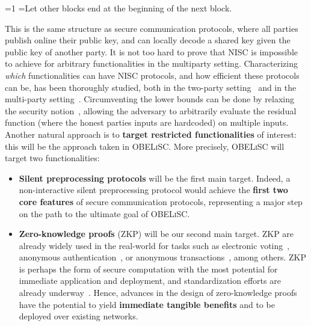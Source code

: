 \documentclass[oneside, a4paper, onecolumn, 11pt]{article}
\newcommand{\OBELiSC}{\textsc{OBELiSC}\xspace}
\newcounter{alphasect}
\def\alphainsection{0}
\newenvironment{alphasection}{%
  \ifnum\alphainsection=1%
    \errhelp={Let other blocks end at the beginning of the next block.}
    \errmessage{Nested Alpha section not allowed}
  \fi%
  \setcounter{alphasect}{0}
  \def\alphainsection{1}
}{%
  \setcounter{alphasect}{0}
  \def\alphainsection{0}
}%
\begin{document}
\begin{alphasection}
This is the same structure as secure communication protocols, where all parties publish online their public key, and can locally decode a shared key given the public key of another party. It is not too hard to prove that NISC is impossible to achieve for arbitrary functionalities in the multiparty setting. Characterizing \emph{which} functionalities can have NISC protocols, and how efficient these protocols can be, has been thoroughly studied, both in the two-party setting~\cite{EC:IKOPS11,EC:AMPR14,EC:MohRos17,AC:BJOV18,C:CDIKLOV19,CCS:BCGIKRS19} and in the multi-party setting~\cite{C:BGIKMP14,AC:HIJKSY17,C:BenKraRab17,EC:MorPasPol20,TCC:BenLin20,C:EOYN21,EC:BJKL21}. Circumventing the lower bounds can be done by relaxing the security notion~\cite{C:BGIKMP14,C:EOYN21}, allowing the adversary to arbitrarily evaluate the residual function (where the honest parties inputs are hardcoded) on multiple inputs. Another natural approach is to \textbf{target restricted functionalities} of interest: this will be the approach taken in \OBELiSC. More precisely, \OBELiSC will target two functionalities:
\begin{itemize}
    \item \textbf{Silent preprocessing protocols} will be the first main target. Indeed, a non-interactive silent preprocessing protocol would achieve the \textbf{first two core features} of secure communication protocols, representing a major step on the path to the ultimate goal of \OBELiSC.
    \item \textbf{Zero-knowledge proofs} (ZKP) will be our second main target. ZKP are already widely used in the real-world for tasks such as electronic voting~\cite{helios,belenios}, anonymous authentication~\cite{AC:Chaum90}, or anonymous transactions~\cite{FC:BAZB20,monero}, among others. ZKP is perhaps the form of secure computation with the most potential for immediate application and deployment, and standardization efforts are already underway~\cite{zkstandard}. Hence, advances in the design of zero-knowledge proofs have the potential to yield \textbf{immediate tangible benefits} and to be deployed over existing networks.
\end{itemize}


\end{alphasection}
\end{document}
